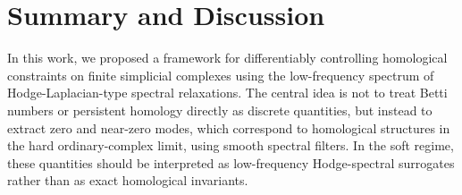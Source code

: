 \documentclass[pdflatex,sn-mathphys-ay]{sn-jnl}%
\theoremstyle{thmstyleone}%
\theoremstyle{thmstyletwo}%
\theoremstyle{thmstylethree}%
\begin{document}








\section{Summary and Discussion}

In this work, we proposed a framework for differentiably controlling homological constraints on finite simplicial complexes using the low-frequency spectrum of Hodge-Laplacian-type spectral relaxations. The central idea is not to treat Betti numbers or persistent homology directly as discrete quantities, but instead to extract zero and near-zero modes, which correspond to homological structures in the hard ordinary-complex limit, using smooth spectral filters.
In the soft regime, these quantities should be interpreted as low-frequency Hodge-spectral surrogates rather than as exact homological invariants.
\end{document}
